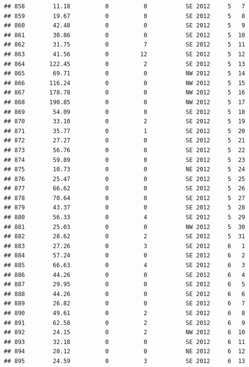 \documentclass[
]{article}
\begin{document}
\begin{verbatim}
## 858        11.18          0          0           SE 2012     5   7
## 859        19.67          0          0           SE 2012     5   8
## 860        42.48          0          0           SE 2012     5   9
## 861        30.86          0          0           SE 2012     5  10
## 862        31.75          0          7           SE 2012     5  11
## 863        41.56          0         12           SE 2012     5  12
## 864       122.45          0          2           SE 2012     5  13
## 865        69.71          0          0           NW 2012     5  14
## 866       116.24          0          0           NW 2012     5  15
## 867       178.78          0          0           NW 2012     5  16
## 868       190.85          0          0           NW 2012     5  17
## 869        54.09          0          0           SE 2012     5  18
## 870        33.10          0          2           SE 2012     5  19
## 871        35.77          0          1           SE 2012     5  20
## 872        27.27          0          0           SE 2012     5  21
## 873        56.76          0          0           SE 2012     5  22
## 874        59.89          0          0           SE 2012     5  23
## 875        10.73          0          0           NE 2012     5  24
## 876        25.47          0          0           SE 2012     5  25
## 877        66.62          0          0           SE 2012     5  26
## 878        70.64          0          0           SE 2012     5  27
## 879        43.37          0          0           SE 2012     5  28
## 880        56.33          0          4           SE 2012     5  29
## 881        25.03          0          0           NW 2012     5  30
## 882        28.62          0          2           SE 2012     5  31
## 883        27.26          0          3           SE 2012     6   1
## 884        57.24          0          0           SE 2012     6   2
## 885        66.63          0          4           SE 2012     6   3
## 886        44.26          0          0           SE 2012     6   4
## 887        29.95          0          0           SE 2012     6   5
## 888        44.26          0          0           SE 2012     6   6
## 889        26.82          0          0           SE 2012     6   7
## 890        49.61          0          2           SE 2012     6   8
## 891        62.58          0          2           SE 2012     6   9
## 892        24.15          0          2           NW 2012     6  10
## 893        32.18          0          0           SE 2012     6  11
## 894        20.12          0          0           NE 2012     6  12
## 895        24.59          0          3           SE 2012     6  13

\end{verbatim}
\end{document}
